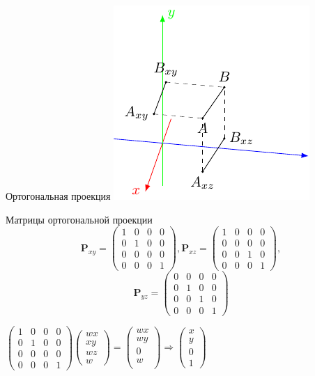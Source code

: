\documentclass[10pt]{beamer}
\begin{document}
  \begin{frame}{Ортогональная проекция}
  	{\includegraphics{line_ortho.pdf}
  	}
  	{
  		\begin{block}{Матрицы ортогональной проекции}
  			$$
  			\mathbf P_{xy}=
  			\begin{pmatrix}				
  				1&0&0&0\\
  				0&1&0&0\\
  				0&0&0&0\\
  				0&0&0&1		
  			\end{pmatrix},							
  			\mathbf P_{xz}=
  			\begin{pmatrix}				
  				1&0&0&0\\
  				0&0&0&0\\
  				0&0&1&0\\
  				0&0&0&1		
  			\end{pmatrix}, $$  $$		
  			\mathbf P_{yz}=
  			\begin{pmatrix}				
  				0&0&0&0\\
  				0&1&0&0\\
  				0&0&1&0\\
  				0&0&0&1		
  			\end{pmatrix}		
  			$$
  			
  		\end{block}
  	}
  	
  	\pause
  	
  	$\begin{pmatrix}				
  		1&0&0&0\\
  		0&1&0&0\\
  		0&0&0&0\\
  		0&0&0&1		
  	\end{pmatrix}
  	\begin{pmatrix}
  		wx\\
  		xy\\
  		wz\\
  		w
  	\end{pmatrix}
  	=
  	\begin{pmatrix}
  		wx\\
  		wy\\
  		0\\
  		w\\
  	\end{pmatrix}
  	\Rightarrow
  	\begin{pmatrix}
  		x\\
  		y\\
  		0\\
  		1
  	\end{pmatrix}
  	$
  	

\end{frame}
\end{document}
